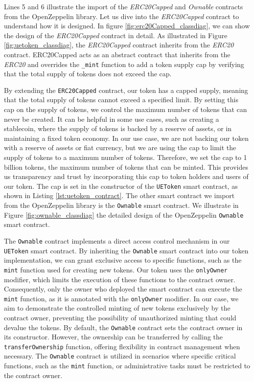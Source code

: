 Lines 5 and 6 illustrate the import of the \textit{ERC20Capped} and \textit{Ownable} contracts from the OpenZeppelin library. Let us dive
into the \textit{ERC20Capped} contract to understand how it is designed. In figure \ref{fig:erc20Capped_classdiag}, we can show
the design of the \textit{ERC20Capped} contract in detail. As illustrated in Figure \ref{fig:uetoken_classdiag}, the \textit{ERC20Capped} contract
inherits from the \textit{ERC20} contract. ERC20Capped acts as an abstract contract that inherits from the \textit{ERC20} and overrides
the \texttt{\_mint} function to add a token supply cap by verifying that the total supply of tokens does not exceed the cap.





By extending the \texttt{ERC20Capped} contract, our token has a capped supply, meaning that the total supply of tokens cannot exceed a specified limit. By setting this cap on the supply of tokens, we control the maximum number of tokens that can never be created. It can be helpful in some use cases, such as creating a stablecoin, where the supply of tokens is backed by a reserve of assets, or in maintaining a fixed token economy. In our use case, we are not backing our token with a reserve of assets or fiat currency, but we are using the cap to limit the supply of tokens to a maximum number of tokens. Therefore, we set the cap to 1 billion tokens, the maximum number of tokens that can be minted. This provides us transparency and trust by incorporating this cap to token holders and users of our token.
The cap is set in the constructor of the \texttt{UEToken} smart contract, as shown in Listing \ref{lst:uetoken_contract}.
The other smart contract we import from the OpenZeppelin library is the \texttt{Ownable} smart contract. We illustrate in Figure \ref{fig:ownable_classdiag} the detailed design of the OpenZeppelin \texttt{Ownable} smart contract.




The \texttt{Ownable} contract implements a direct access control mechanism in our \texttt{UEToken} smart contract. By inheriting the
\texttt{Ownable} smart contract into our token implementation, we can grant exclusive access to specific functions, such as the \texttt{mint} function used for creating new tokens.
Our token uses the \texttt{onlyOwner} modifier, which limits the execution of these functions to the contract owner. Consequently, only the owner who deployed the smart contract can execute
the \texttt{mint} function, as it is annotated with the \texttt{onlyOwner} modifier. In our case, we aim to demonstrate the controlled minting
of new tokens exclusively by the contract owner, preventing the possibility of unauthorized minting that could devalue the tokens.
By default, the \texttt{Ownable} contract sets the contract owner in its constructor. However, the ownership can be transferred by calling the
\texttt{transferOwnership} function, offering flexibility in contract management when necessary. The \texttt{Ownable} contract is utilized in
scenarios where specific critical functions, such as the \texttt{mint} function, or administrative tasks must be restricted to the contract
owner.


